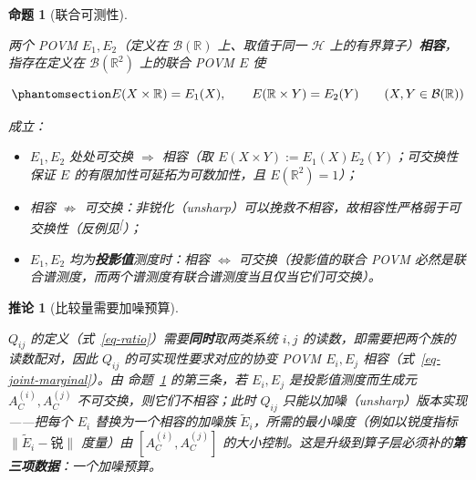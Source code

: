 \documentclass[
  chinese,
  a4paper,
  UTF8,
  12pt,
  oneside,
  openany]{ctexbook}
\providecommand{\tightlist}{%
  \setlength{\itemsep}{0pt}\setlength{\parskip}{0pt}}
\theoremstyle{plain}
\theoremstyle{plain}
\theoremstyle{plain}
\newtheorem{proposition}{命题}[chapter]
\theoremstyle{definition}
\theoremstyle{plain}
\newtheorem{corollary}{推论}[chapter]
\theoremstyle{plain}
\theoremstyle{remark}
\begin{document}
\begin{proposition}[联合可测性]\protect\hypertarget{prp-joint-meas}{}\label{prp-joint-meas}

两个 POVM \(E_1,E_2\)（定义在 \(\mathcal{B}(\mathbb{R})\) 上、取值于同一
\(\mathcal{H}\) 上的有界算子）\textbf{相容}，指存在定义在
\(\mathcal{B}(\mathbb{R}^{2})\) 上的联合 POVM \(E\) 使

\begin{equation}\protect\phantomsection\label{eq-joint-marginal}{
E(X\times\mathbb{R})=E_1(X),
\qquad
E(\mathbb{R}\times Y)=E_2(Y)
\qquad (X,Y\in\mathcal{B}(\mathbb{R}))
}\end{equation}

成立：

\begin{itemize}
\tightlist
\item
  \(E_1,E_2\) 处处可交换 \(\Longrightarrow\) 相容（取
  \(E(X\times Y):=E_1(X)E_2(Y)\)；可交换性保证 \(E\)
  的有限加性可延拓为可数加性，且 \(E(\mathbb{R}^{2})=1\)）；
\item
  相容 \(\not\Longrightarrow\)
  可交换：非锐化（unsharp）可以挽救不相容，故相容性严格弱于可交换性（反例见\textsuperscript{{[}\citeproc{ref-busch1995}{30}{]}}）；
\item
  \(E_1,E_2\) 均为\textbf{投影值}测度时：相容 \(\iff\)
  可交换（投影值的联合 POVM
  必然是联合谱测度，而两个谱测度有联合谱测度当且仅当它们可交换）。
\end{itemize}

\end{proposition}

\begin{corollary}[比较量需要加噪预算]\protect\hypertarget{cor-joint-noise}{}\label{cor-joint-noise}

\(Q_{ij}\) 的定义（式~\ref{eq-ratio}）需要\textbf{同时}取两类系统
\(i,j\) 的读数，即需要把两个族的读数配对，因此 \(Q_{ij}\)
的可实现性要求对应的协变 POVM \(E_i,E_j\)
相容（式~\ref{eq-joint-marginal}）。由 命题~\ref{prp-joint-meas}
的第三条，若 \(E_i,E_j\) 是投影值测度而生成元 \(A_C^{(i)},A_C^{(j)}\)
不可交换，则它们不相容；此时 \(Q_{ij}\)
只能以加噪（unsharp）版本实现------把每个 \(E_i\) 替换为一个相容的加噪族
\(\tilde E_i\)，所需的最小噪度（例如以锐度指标
\(\|\tilde E_i-\text{锐}\|\) 度量）由
\(\left[A_C^{(i)},A_C^{(j)}\right]\)
的大小控制。这是升级到算子层必须补的\textbf{第三项数据}：一个加噪预算。

\end{corollary}
\end{document}
